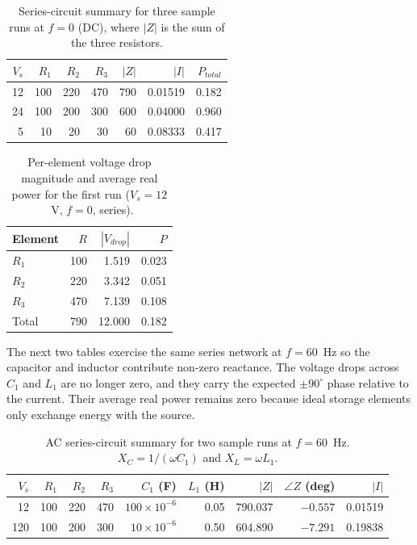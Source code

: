 \documentclass[11pt]{article}
\begin{document}
\begin{table}[h]
\centering
\caption{Series-circuit summary for three sample runs at $f = 0$ (DC), where
$|Z|$ is the sum of the three resistors.}
\begin{tabular}{@{}rrrrrrr@{}}
\toprule
$V_s$ & $R_1$& $R_2$& $R_3$
& $|Z|$& $|I|$& $P_{total}$\\
\midrule
12 & 100 & 220 & 470 & 790 & 0.01519 & 0.182 \\
24 & 100 & 200 & 300 & 600 & 0.04000 & 0.960 \\
 5 &  10 &  20 &  30 &  60 & 0.08333 & 0.417 \\
\bottomrule
\end{tabular}
\end{table}

\begin{table}[h]
\centering
\caption{Per-element voltage drop magnitude and average real power for the
first run ($V_s = 12$~V, $f = 0$, series).}
\begin{tabular}{@{}lrrr@{}}
\toprule
Element & $R$& $|V_{drop}|$& $P$\\
\midrule
$R_1$ & 100 & 1.519 & 0.023 \\
$R_2$ & 220 & 3.342 & 0.051 \\
$R_3$ & 470 & 7.139 & 0.108 \\
\midrule
Total & 790 & 12.000 & 0.182 \\
\bottomrule
\end{tabular}
\end{table}

The next two tables exercise the same series network at $f = 60$~Hz so the
capacitor and inductor contribute non-zero reactance. The voltage drops
across $C_1$ and $L_1$ are no longer zero, and they carry the expected
$\pm 90^{\circ}$ phase relative to the current. Their average real power
remains zero because ideal storage elements only exchange energy with the
source.

\begin{table}[h]
\centering
\caption{AC series-circuit summary for two sample runs at $f = 60$~Hz.
$X_C = 1/(\omega C_1)$ and $X_L = \omega L_1$.}
\begin{tabular}{@{}rrrrrrrrr@{}}
\toprule
$V_s$ & $R_1$& $R_2$& $R_3$& $C_1$ (F)& $L_1$ (H)
& $|Z|$& $\angle Z$ (deg)& $|I|$\\
\midrule
 12 & 100 & 220 & 470 & $100\!\times\!10^{-6}$ & 0.05 & 790.037 & $-0.557$ & 0.01519 \\
120 & 100 & 200 & 300 & $ 10\!\times\!10^{-6}$ & 0.50 & 604.890 & $-7.291$ & 0.19838 \\
\bottomrule
\end{tabular}
\end{table}
\end{document}
